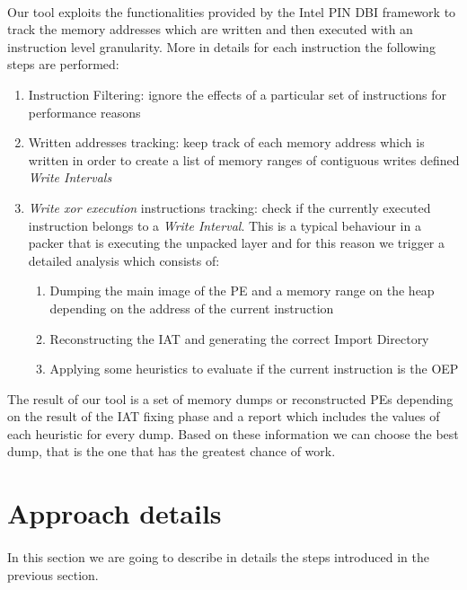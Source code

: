 \paragraph{}
Our tool exploits the functionalities provided by the Intel PIN \ac{DBI} framework to track the memory addresses which are written and then executed with an instruction level granularity.
More in details for each instruction the following steps are performed:
\begin{enumerate}
\item Instruction Filtering: ignore the effects of a particular set of instructions for performance reasons
\item Written addresses tracking: keep track of each memory address which is written in order to create a list of memory ranges of contiguous writes defined \textit{Write Intervals} 
\item \textit{Write xor execution} instructions tracking: check if the currently executed instruction belongs to a \textit{Write Interval}. This is a typical behaviour in a packer that is executing the unpacked layer and for this reason we trigger a detailed analysis which consists of:
	\begin{enumerate}
	\item Dumping the main image of the \ac{PE} and a memory range on the heap depending on the address of the current instruction
	\item Reconstructing the \ac{IAT} and generating the correct Import Directory
	\item Applying some heuristics to evaluate if the current instruction is the \ac{OEP}
	\end{enumerate}
\end{enumerate}
The result of our tool is a set of memory dumps or reconstructed \acp{PE} depending on the result of the \ac{IAT} fixing phase and a report which includes the values of each heuristic for every dump. Based on these information we can choose the best dump, that is the one that has the greatest chance of work.

\section{Approach details}
\paragraph{}
In this section we are going to describe in details the steps introduced in the previous section.
